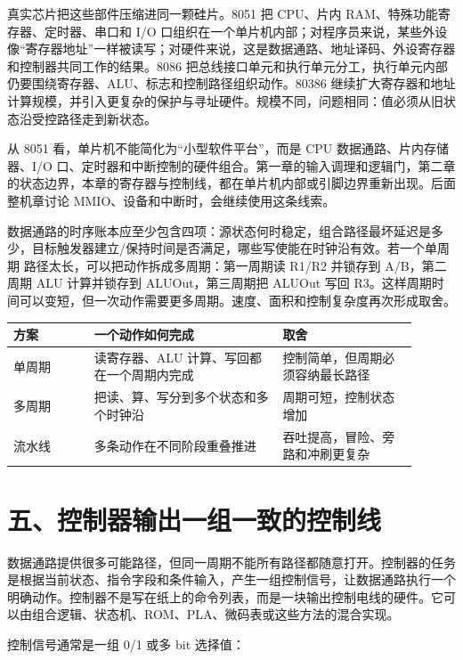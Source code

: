 真实芯片把这些部件压缩进同一颗硅片。8051 把 CPU、片内 RAM、特殊功能寄存器、定时器、串口和 I/O 口组织在一个单片机内部；对程序员来说，某些外设像“寄存器地址”一样被读写；对硬件来说，这是数据通路、地址译码、外设寄存器和控制器共同工作的结果。8086 把总线接口单元和执行单元分工，执行单元内部仍要围绕寄存器、ALU、标志和控制路径组织动作。80386 继续扩大寄存器和地址计算规模，并引入更复杂的保护与寻址硬件。规模不同，问题相同：值必须从旧状态沿受控路径走到新状态。

\begin{chipcase}
从 8051 看，单片机不能简化为“小型软件平台”，而是 CPU 数据通路、片内存储器、I/O 口、定时器和中断控制的硬件组合。第一章的输入调理和逻辑门，第二章的状态边界，本章的寄存器与控制线，都在单片机内部或引脚边界重新出现。后面整机章讨论 MMIO、设备和中断时，会继续使用这条线索。
\end{chipcase}

数据通路的时序账本应至少包含四项：源状态何时稳定，组合路径最坏延迟是多少，目标触发器建立/保持时间是否满足，哪些写使能在时钟沿有效。若一个单周期  路径太长，可以把动作拆成多周期：第一周期读 R1/R2 并锁存到 A/B，第二周期 ALU 计算并锁存到 ALUOut，第三周期把 ALUOut 写回 R3。这样周期时间可以变短，但一次动作需要更多周期。速度、面积和控制复杂度再次形成取舍。

\begin{longtable}{L{0.18\linewidth}L{0.42\linewidth}L{0.3\linewidth}}
\toprule
方案 & 一个动作如何完成 & 取舍 \\
\midrule
单周期 & 读寄存器、ALU 计算、写回都在一个周期内完成 & 控制简单，但周期必须容纳最长路径 \\
多周期 & 把读、算、写分到多个状态和多个时钟沿 & 周期可短，控制状态增加 \\
流水线 & 多条动作在不同阶段重叠推进 & 吞吐提高，冒险、旁路和冲刷更复杂 \\
\bottomrule
\end{longtable}

\section{五、控制器输出一组一致的控制线}

数据通路提供很多可能路径，但同一周期不能所有路径都随意打开。控制器的任务是根据当前状态、指令字段和条件输入，产生一组控制信号，让数据通路执行一个明确动作。控制器不是写在纸上的命令列表，而是一块输出控制电线的硬件。它可以由组合逻辑、状态机、ROM、PLA、微码表或这些方法的混合实现。

控制信号通常是一组 0/1 或多 bit 选择值：

